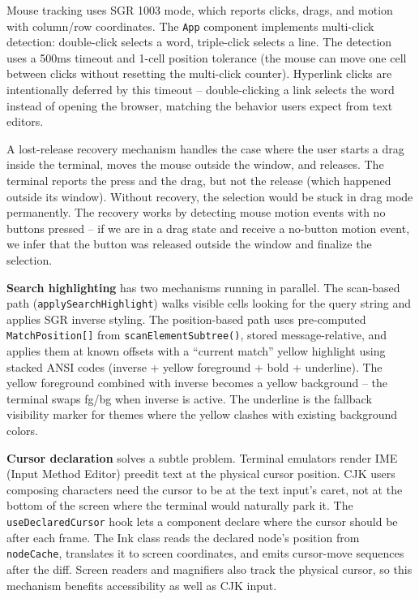 \documentclass[
  english,
  11pt,
  letterpaper,
]{book}
\begin{document}
Mouse tracking uses SGR 1003 mode, which reports clicks, drags, and
motion with column/row coordinates. The \texttt{App} component
implements multi-click detection: double-click selects a word,
triple-click selects a line. The detection uses a 500ms timeout and
1-cell position tolerance (the mouse can move one cell between clicks
without resetting the multi-click counter). Hyperlink clicks are
intentionally deferred by this timeout -- double-clicking a link selects
the word instead of opening the browser, matching the behavior users
expect from text editors.

A lost-release recovery mechanism handles the case where the user starts
a drag inside the terminal, moves the mouse outside the window, and
releases. The terminal reports the press and the drag, but not the
release (which happened outside its window). Without recovery, the
selection would be stuck in drag mode permanently. The recovery works by
detecting mouse motion events with no buttons pressed -- if we are in a
drag state and receive a no-button motion event, we infer that the
button was released outside the window and finalize the selection.

\textbf{Search highlighting} has two mechanisms running in parallel. The
scan-based path (\texttt{applySearchHighlight}) walks visible cells
looking for the query string and applies SGR inverse styling. The
position-based path uses pre-computed \texttt{MatchPosition{[}{]}} from
\texttt{scanElementSubtree()}, stored message-relative, and applies them
at known offsets with a ``current match'' yellow highlight using stacked
ANSI codes (inverse + yellow foreground + bold + underline). The yellow
foreground combined with inverse becomes a yellow background -- the
terminal swaps fg/bg when inverse is active. The underline is the
fallback visibility marker for themes where the yellow clashes with
existing background colors.

\textbf{Cursor declaration} solves a subtle problem. Terminal emulators
render IME (Input Method Editor) preedit text at the physical cursor
position. CJK users composing characters need the cursor to be at the
text input's caret, not at the bottom of the screen where the terminal
would naturally park it. The \texttt{useDeclaredCursor} hook lets a
component declare where the cursor should be after each frame. The Ink
class reads the declared node's position from \texttt{nodeCache},
translates it to screen coordinates, and emits cursor-move sequences
after the diff. Screen readers and magnifiers also track the physical
cursor, so this mechanism benefits accessibility as well as CJK input.
\end{document}
